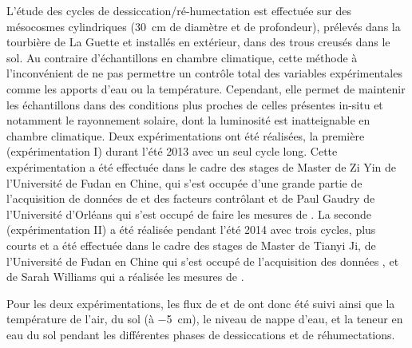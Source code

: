 L'étude des cycles de dessiccation/ré-humectation est effectuée sur des mésocosmes cylindriques (\SI{30}{\centi\metre} de diamètre et de profondeur), prélevés dans la tourbière de La Guette et installés en extérieur, dans des trous creusés dans le sol.
Au contraire d'échantillons en chambre climatique, cette méthode à l'inconvénient de ne pas permettre un contrôle total des variables expérimentales comme les apports d'eau ou la température.
Cependant, elle permet de maintenir les échantillons dans des conditions plus proches de celles présentes in-situ et notamment le rayonnement solaire, dont la luminosité est inatteignable en chambre climatique.
Deux expérimentations ont été réalisées, la première (expérimentation I) durant l'été 2013 avec un seul cycle long.
Cette expérimentation a été effectuée dans le cadre des stages de Master de Zi Yin de l'Université de Fudan en Chine, qui s'est occupée d'une grande partie de l'acquisition de données de \coo et des facteurs contrôlant et de Paul Gaudry de l'Université d'Orléans qui s'est occupé de faire les mesures de \chh.
La seconde (expérimentation II) a été réalisée pendant l'été 2014 avec trois cycles, plus courts et a été effectuée dans le cadre des stages de Master de Tianyi Ji, de l'Université de Fudan en Chine qui s'est occupé de l'acquisition des données \coo, et de Sarah Williams qui a réalisée les mesures de \chh. 

Pour les deux expérimentations, les flux de \coo et de \chh ont donc été suivi ainsi que la température de l'air, du sol (à \SI{-5}{\centi\metre}), le niveau de nappe d'eau, et la teneur en eau du sol pendant les différentes phases de dessiccations et de réhumectations. 

